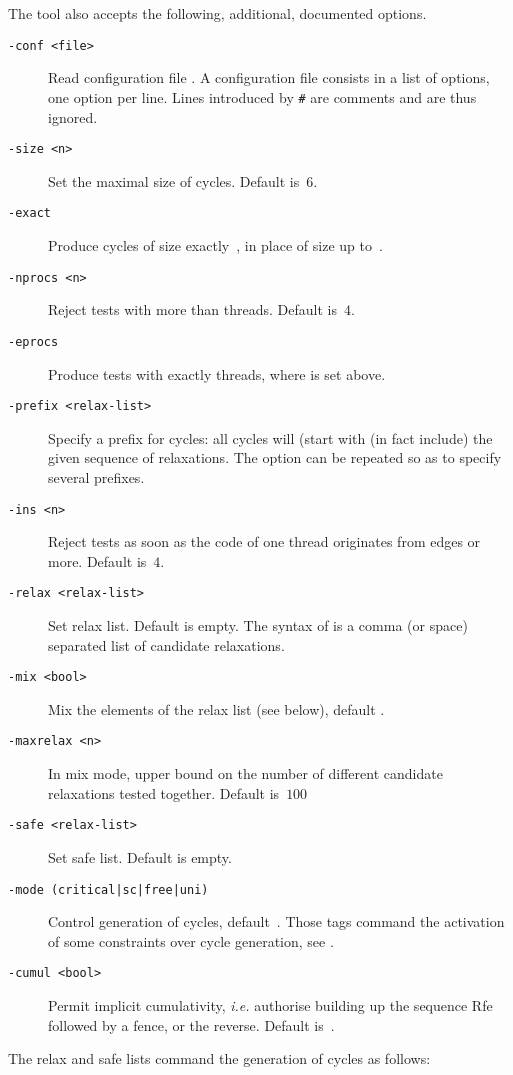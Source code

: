 The tool \diy{} also accepts the following, additional, documented options.
\begin{description}
\item[{\tt -conf <file>}] Read configuration file .
A configuration file consists in a list of options, one option per line.
Lines introduced by \verb+#+ are comments and are thus ignored.
\item[{\tt -size <n>}] Set the maximal size of cycles. Default is~$6$.
\item[{\tt -exact}] Produce cycles of size exactly~,
in place of size up to~.
\item[{\tt -nprocs <n>}] Reject tests with more than  threads.
Default is~$4$.
\item[{\tt -eprocs}] Produce tests with exactly 
threads, where  is set above.
\item[{\tt -prefix <relax-list>}] Specify a prefix for cycles: all cycles will (start with (in fact include) the given sequence of relaxations. The option can be repeated so as to specify several prefixes.
\item[{\tt -ins <n>}] Reject tests as soon as the code of one thread
originates from  edges or more. Default is~$4$.
\item[{\tt -relax <relax-list>}] Set relax list. Default is empty.
The syntax of  is a comma (or space)
separated list of candidate relaxations.
\item[{\tt -mix <bool>}] Mix the elements of the relax list
(see below), default .
\item[{\tt -maxrelax <n>}]
In mix mode, upper bound on the number of different candidate
relaxations tested together.
Default is~$100$
\item[{\tt -safe <relax-list>}] Set safe list. Default is empty.
\item[{\tt -mode (critical|sc|free|uni)}]
Control generation  of cycles, default~.
Those tags command the activation of some constraints over cycle
generation, see .
\item[{\tt -cumul <bool>}]
Permit implicit cumulativity,
\emph{i.e.} authorise building up the sequence Rfe followed by a fence,
or the reverse. Default is~.
\end{description}
The relax and safe lists command the generation of
cycles as follows:
